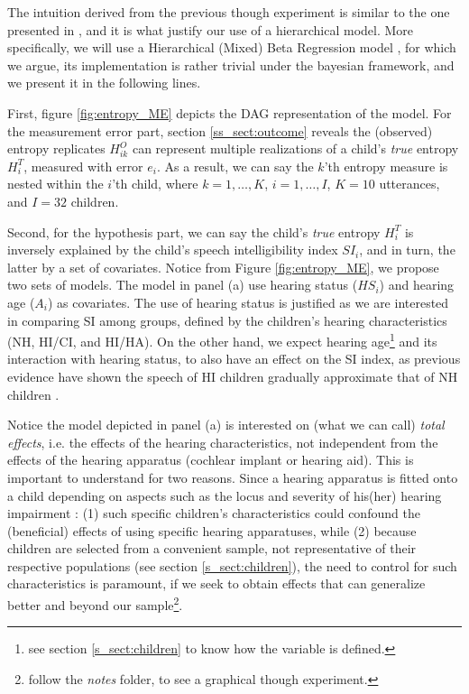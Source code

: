 The intuition derived from the previous though experiment is similar to the one presented in \citet{Boonen_et_al_2021}, and it is what justify our use of a hierarchical model. More specifically, we will use a Hierarchical (Mixed) Beta Regression model \citep{Figueroa-Zuniga_et_al_2013}, for which we argue, its implementation is rather trivial under the bayesian framework, and we present it in the following lines.

First, figure \ref{fig:entropy_ME} depicts the DAG representation of the model. For the measurement error part, section \ref{ss_sect:outcome} reveals the (observed) entropy replicates $H^{O}_{ik}$ can represent multiple realizations of a child's \textit{true} entropy $H^{T}_{i}$, measured with error $e_i$. As a result, we can say the $k$'th entropy measure is nested within the $i$'th child, where $k=1, \dots, K$, $i=1, \dots, I$, $K = 10$ utterances, and $I = 32$ children.

Second, for the hypothesis part, we can say the child's \textit{true} entropy $H^{T}_{i}$ is inversely explained by the child's speech intelligibility index $SI_{i}$, and in turn, the latter by a set of covariates. Notice from Figure \ref{fig:entropy_ME}, we propose two sets of models. The model in panel (a) use hearing status ($HS_{i}$) and hearing age ($A_{i}$) as covariates. The use of hearing status is justified as we are interested in comparing SI among groups, defined by the children's hearing characteristics (NH, HI/CI, and HI/HA). On the other hand, we expect hearing age\footnote{see section \ref{s_sect:children} to know how the variable is defined.} and its interaction with hearing status, to also have an effect on the SI index, as previous evidence have shown the speech of HI children gradually approximate that of NH children \citep{Boonen_et_al_2019}.

Notice the model depicted in panel (a) is interested on (what we can call) \textit{total effects}, i.e. the effects of the hearing characteristics, not independent from the effects of the hearing apparatus (cochlear implant or hearing aid). This is important to understand for two reasons. Since a hearing apparatus is fitted onto a child depending on aspects such as the locus and severity of his(her) hearing impairment \citep{Korver_et_al_2017}: (1) such specific children's characteristics could confound the (beneficial) effects of using specific hearing apparatuses, while (2) because children are selected from a convenient sample, not representative of their respective populations (see section \ref{s_sect:children}), the need to control for such characteristics is paramount, if we seek to obtain effects that can generalize better and beyond our sample\footnote{follow the \textit{notes} folder, to see a graphical though experiment.}.

